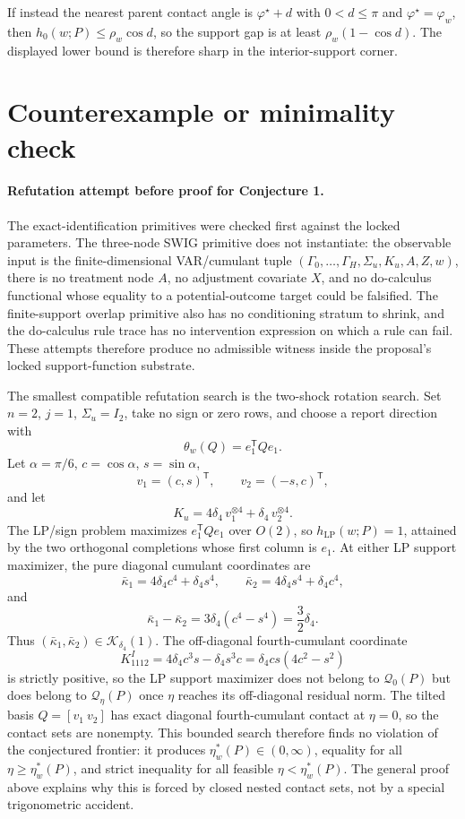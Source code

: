 \documentclass[11pt]{article}
\newcommand{\transpose}{\mathsf{T}}
\theoremstyle{definition}
\theoremstyle{plain}
\theoremstyle{remark}
\begin{document}
If instead the nearest parent contact angle is \(\varphi^\star+d\) with \(0<d\le\pi\) and \(\varphi^\star=\varphi_w\), then \(h_0(w;P)\le\rho_w\cos d\), so the support gap is at least \(\rho_w(1-\cos d)\).  The displayed lower bound is therefore sharp in the interior-support corner.

\section{Counterexample or minimality check}
\paragraph{Refutation attempt before proof for Conjecture 1.}
The exact-identification primitives were checked first against the locked parameters.  The three-node SWIG primitive does not instantiate: the observable input is the finite-dimensional VAR/cumulant tuple \((\Gamma_0,\ldots,\Gamma_H,\Sigma_u,K_u,A,Z,w)\), there is no treatment node \(A\), no adjustment covariate \(X\), and no do-calculus functional whose equality to a potential-outcome target could be falsified.  The finite-support overlap primitive also has no conditioning stratum to shrink, and the do-calculus rule trace has no intervention expression on which a rule can fail.  These attempts therefore produce no admissible witness inside the proposal's locked support-function substrate.

The smallest compatible refutation search is the two-shock rotation search.  Set \(n=2\), \(j=1\), \(\Sigma_u=I_2\), take no sign or zero rows, and choose a report direction with
\[
\theta_w(Q)=e_1^\transpose Qe_1 .
\]
Let \(\alpha=\pi/6\), \(c=\cos\alpha\), \(s=\sin\alpha\),
\[
v_1=(c,s)^\transpose,\qquad v_2=(-s,c)^\transpose,
\]
and let
\[
K_u=4\delta_4\,v_1^{\otimes4}+\delta_4\,v_2^{\otimes4}.
\]
The LP/sign problem maximizes \(e_1^\transpose Qe_1\) over \(O(2)\), so \(h_{\mathrm{LP}}(w;P)=1\), attained by the two orthogonal completions whose first column is \(e_1\).  At either LP support maximizer, the pure diagonal cumulant coordinates are
\[
\bar\kappa_1=4\delta_4c^4+\delta_4s^4,\qquad
\bar\kappa_2=4\delta_4s^4+\delta_4c^4,
\]
and
\[
\bar\kappa_1-\bar\kappa_2
=3\delta_4(c^4-s^4)
=\frac{3}{2}\delta_4 .
\]
Thus \((\bar\kappa_1,\bar\kappa_2)\in\mathcal K_{\delta_4}(1)\).  The off-diagonal fourth-cumulant coordinate
\[
K^I_{1112}
=4\delta_4c^3s-\delta_4s^3c
=\delta_4cs(4c^2-s^2)
\]
is strictly positive, so the LP support maximizer does not belong to \(\mathcal Q_0(P)\) but does belong to \(\mathcal Q_\eta(P)\) once \(\eta\) reaches its off-diagonal residual norm.  The tilted basis \(Q=[v_1\ v_2]\) has exact diagonal fourth-cumulant contact at \(\eta=0\), so the contact sets are nonempty.  This bounded search therefore finds no violation of the conjectured frontier: it produces \(\eta_w^*(P)\in(0,\infty)\), equality for all \(\eta\ge\eta_w^*(P)\), and strict inequality for all feasible \(\eta<\eta_w^*(P)\).  The general proof above explains why this is forced by closed nested contact sets, not by a special trigonometric accident.
\end{document}
